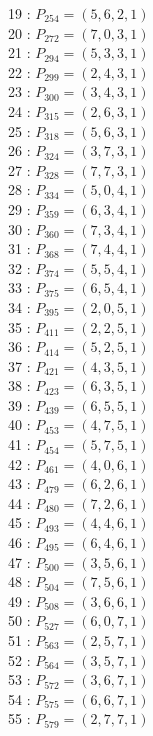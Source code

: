 \documentclass{article}
\begin{document}
{\begin{multicols}{2}
19 : $P_{254}=( 5, 6, 2, 1 )$\\
20 : $P_{272}=( 7, 0, 3, 1 )$\\
21 : $P_{294}=( 5, 3, 3, 1 )$\\
22 : $P_{299}=( 2, 4, 3, 1 )$\\
23 : $P_{300}=( 3, 4, 3, 1 )$\\
24 : $P_{315}=( 2, 6, 3, 1 )$\\
25 : $P_{318}=( 5, 6, 3, 1 )$\\
26 : $P_{324}=( 3, 7, 3, 1 )$\\
27 : $P_{328}=( 7, 7, 3, 1 )$\\
28 : $P_{334}=( 5, 0, 4, 1 )$\\
29 : $P_{359}=( 6, 3, 4, 1 )$\\
30 : $P_{360}=( 7, 3, 4, 1 )$\\
31 : $P_{368}=( 7, 4, 4, 1 )$\\
32 : $P_{374}=( 5, 5, 4, 1 )$\\
33 : $P_{375}=( 6, 5, 4, 1 )$\\
34 : $P_{395}=( 2, 0, 5, 1 )$\\
35 : $P_{411}=( 2, 2, 5, 1 )$\\
36 : $P_{414}=( 5, 2, 5, 1 )$\\
37 : $P_{421}=( 4, 3, 5, 1 )$\\
38 : $P_{423}=( 6, 3, 5, 1 )$\\
39 : $P_{439}=( 6, 5, 5, 1 )$\\
40 : $P_{453}=( 4, 7, 5, 1 )$\\
41 : $P_{454}=( 5, 7, 5, 1 )$\\
42 : $P_{461}=( 4, 0, 6, 1 )$\\
43 : $P_{479}=( 6, 2, 6, 1 )$\\
44 : $P_{480}=( 7, 2, 6, 1 )$\\
45 : $P_{493}=( 4, 4, 6, 1 )$\\
46 : $P_{495}=( 6, 4, 6, 1 )$\\
47 : $P_{500}=( 3, 5, 6, 1 )$\\
48 : $P_{504}=( 7, 5, 6, 1 )$\\
49 : $P_{508}=( 3, 6, 6, 1 )$\\
50 : $P_{527}=( 6, 0, 7, 1 )$\\
51 : $P_{563}=( 2, 5, 7, 1 )$\\
52 : $P_{564}=( 3, 5, 7, 1 )$\\
53 : $P_{572}=( 3, 6, 7, 1 )$\\
54 : $P_{575}=( 6, 6, 7, 1 )$\\
55 : $P_{579}=( 2, 7, 7, 1 )$\\
\end{multicols}
}
\end{document}
